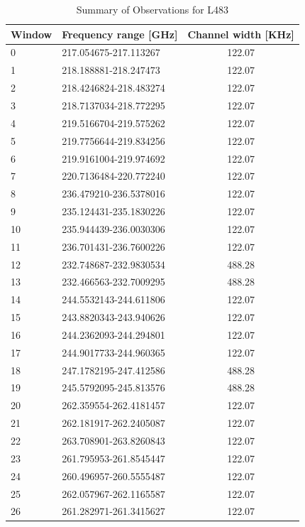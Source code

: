 \renewcommand{\arraystretch}{1.5}
\begin{table}[htb]
\begin{center}
  \caption{Summary of Observations for L483}
  \label{tab:Obs_L483}
{\scriptsize
  \begin{tabular}{llc} \hline \hline
  Window & Frequency range [GHz] & Channel width [KHz]  \\ \hline
0&217.054675-217.113267&122.07 \\
1&218.188881-218.247473&122.07\\
2&218.4246824-218.483274&122.07\\
3&218.7137034-218.772295&122.07\\
4&219.5166704-219.575262&122.07\\
5&219.7756644-219.834256&122.07\\
6&219.9161004-219.974692&122.07\\
7&220.7136484-220.772240&122.07\\
8&236.479210-236.5378016&122.07\\
9&235.124431-235.1830226&122.07\\
10&235.944439-236.0030306&122.07\\
11&236.701431-236.7600226&122.07\\
12&232.748687-232.9830534&488.28\\
13&232.466563-232.7009295&488.28\\
14&244.5532143-244.611806&122.07\\
15&243.8820343-243.940626&122.07\\
16&244.2362093-244.294801&122.07\\
17&244.9017733-244.960365&122.07\\
18&247.1782195-247.412586&488.28\\
19&245.5792095-245.813576&488.28\\
20&262.359554-262.4181457&122.07\\
21&262.181917-262.2405087&122.07\\
22&263.708901-263.8260843&122.07\\
23&261.795953-261.8545447&122.07\\
24&260.496957-260.5555487&122.07\\
25&262.057967-262.1165587&122.07\\
26&261.282971-261.3415627&122.07\\ \hline
  \end{tabular}
  }
\end{center}
\end{table}


